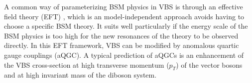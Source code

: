 A common way of parameterizing BSM physics in VBS is through an effective field theory (EFT) \cite{Longhitano:1980tm}, which is an model-independent approach avoids having to choose a specific BSM theory.
It suits well particularly if the energy scale of the BSM physics is too high for the new resonances of the theory to be observed directly. In this EFT framework, VBS can be modified by anomalous quartic gauge couplings (aQGC). 
A typical prediction of aQGCs is an enhancement of the VBS cross-section at high transverse momentum ($p_T$) of the vector bosons and at high invariant mass of the diboson system.
